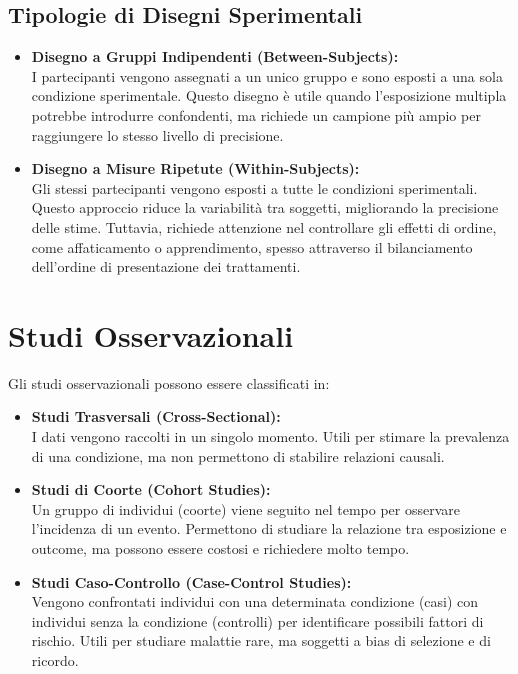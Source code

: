\documentclass[
  letterpaper,
]{krantz}
\begin{document}
\subsection{Tipologie di Disegni
Sperimentali}\label{tipologie-di-disegni-sperimentali}

\begin{itemize}
\item
  \textbf{Disegno a Gruppi Indipendenti (Between-Subjects):}\\
  I partecipanti vengono assegnati a un unico gruppo e sono esposti a
  una sola condizione sperimentale. Questo disegno è utile quando
  l'esposizione multipla potrebbe introdurre confondenti, ma richiede un
  campione più ampio per raggiungere lo stesso livello di precisione.
\item
  \textbf{Disegno a Misure Ripetute (Within-Subjects):}\\
  Gli stessi partecipanti vengono esposti a tutte le condizioni
  sperimentali. Questo approccio riduce la variabilità tra soggetti,
  migliorando la precisione delle stime. Tuttavia, richiede attenzione
  nel controllare gli effetti di ordine, come affaticamento o
  apprendimento, spesso attraverso il bilanciamento dell'ordine di
  presentazione dei trattamenti.
\end{itemize}

\section{Studi Osservazionali}\label{studi-osservazionali}

Gli studi osservazionali possono essere classificati in:

\begin{itemize}
\item
  \textbf{Studi Trasversali (Cross-Sectional):}\\
  I dati vengono raccolti in un singolo momento. Utili per stimare la
  prevalenza di una condizione, ma non permettono di stabilire relazioni
  causali.
\item
  \textbf{Studi di Coorte (Cohort Studies):}\\
  Un gruppo di individui (coorte) viene seguito nel tempo per osservare
  l'incidenza di un evento. Permettono di studiare la relazione tra
  esposizione e outcome, ma possono essere costosi e richiedere molto
  tempo.
\item
  \textbf{Studi Caso-Controllo (Case-Control Studies):}\\
  Vengono confrontati individui con una determinata condizione (casi)
  con individui senza la condizione (controlli) per identificare
  possibili fattori di rischio. Utili per studiare malattie rare, ma
  soggetti a bias di selezione e di ricordo.
\end{itemize}
\end{document}
